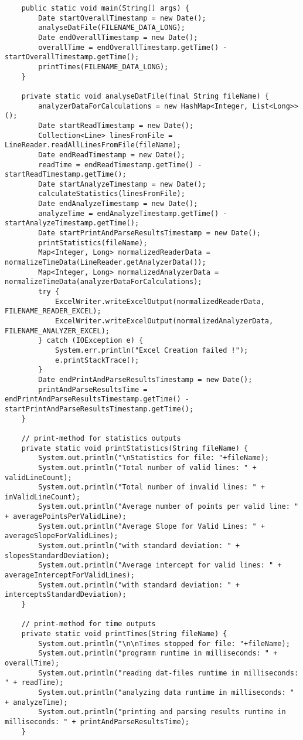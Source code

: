 \begin{lstlisting}
	public static void main(String[] args) {
		Date startOverallTimestamp = new Date();
		analyseDatFile(FILENAME_DATA_LONG);
		Date endOverallTimestamp = new Date();
		overallTime = endOverallTimestamp.getTime() - startOverallTimestamp.getTime();
		printTimes(FILENAME_DATA_LONG);
	}
	
	private static void analyseDatFile(final String fileName) {
		analyzerDataForCalculations = new HashMap<Integer, List<Long>>();
		Date startReadTimestamp = new Date();
		Collection<Line> linesFromFile = LineReader.readAllLinesFromFile(fileName);
		Date endReadTimestamp = new Date();
		readTime = endReadTimestamp.getTime() - startReadTimestamp.getTime();
		Date startAnalyzeTimestamp = new Date();
		calculateStatistics(linesFromFile);
		Date endAnalyzeTimestamp = new Date();
		analyzeTime = endAnalyzeTimestamp.getTime() - startAnalyzeTimestamp.getTime();
		Date startPrintAndParseResultsTimestamp = new Date();
		printStatistics(fileName);
		Map<Integer, Long> normalizedReaderData = normalizeTimeData(LineReader.getAnalyzerData());
		Map<Integer, Long> normalizedAnalyzerData = normalizeTimeData(analyzerDataForCalculations);
		try {
			ExcelWriter.writeExcelOutput(normalizedReaderData, FILENAME_READER_EXCEL);
			ExcelWriter.writeExcelOutput(normalizedAnalyzerData, FILENAME_ANALYZER_EXCEL);
		} catch (IOException e) {
			System.err.println("Excel Creation failed !");
			e.printStackTrace();
		}
		Date endPrintAndParseResultsTimestamp = new Date();
		printAndParseResultsTime = endPrintAndParseResultsTimestamp.getTime() - startPrintAndParseResultsTimestamp.getTime();		
	}
	
	// print-method for statistics outputs
	private static void printStatistics(String fileName) {
		System.out.println("\nStatistics for file: "+fileName);
		System.out.println("Total number of valid lines: " + validLineCount);
		System.out.println("Total number of invalid lines: " + inValidLineCount);
		System.out.println("Average number of points per valid line: " + averagePointsPerValidLine);
		System.out.println("Average Slope for Valid Lines: " + averageSlopeForValidLines);
		System.out.println("with standard deviation: " + slopesStandardDeviation);
		System.out.println("Average intercept for valid lines: " + averageInterceptForValidLines);
		System.out.println("with standard deviation: " + interceptsStandardDeviation);
	}
	
	// print-method for time outputs
	private static void printTimes(String fileName) {
		System.out.println("\n\nTimes stopped for file: "+fileName);
		System.out.println("programm runtime in milliseconds: " + overallTime);
		System.out.println("reading dat-files runtime in milliseconds: " + readTime);
		System.out.println("analyzing data runtime in milliseconds: " + analyzeTime);
		System.out.println("printing and parsing results runtime in milliseconds: " + printAndParseResultsTime);
	}
	

\end{lstlisting}
